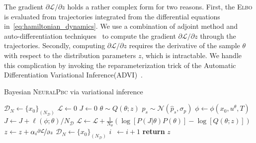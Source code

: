 \begin{enumerate}
    The gradient ${\partial \mathcal{L}}/{\partial z}$ holds a rather complex form for two reasons.
    First, the \textsc{Elbo} is evaluated from trajectories integrated from the differential equations in~\eqref{eq:hamiltonian_dynamics}.
    We use a combination of adjoint method and auto-differentiation techniques~\cite{chen2018neural} to compute the
    gradient ${\partial \mathcal{L}}/{\partial z}$ through the trajectories.
    Secondly, computing ${\partial \mathcal{L}}/{\partial z}$ requires the derivative
    of the sample $\theta$ with respect to the distribution parameters $z$, which is
    intractable. We handle this complication by invoking the reparameterization
    trick of the Automatic Differentiation Variational
    Inference(\textsc{ADVI})~\cite{kucukelbir2015automatic}.

    \begin{algorithm}
        \caption{Bayesian \textsc{NeuralPbc} via variational inference}
        \label{algo:vi}
        \small
        \begin{algorithmic}[1]
            \algrenewcommand\algorithmicindent{0em} %
            \State $\mathcal{D}_N \gets \{x_0\}_{(N_{\mathcal{D}})}$   
            \algrenewcommand\algorithmicindent{1.1em} %
            \State $\mathcal{L} \gets 0$ 
             
            \State $J \gets 0$ 
            \State $\theta \sim Q(\theta; z)$ 
                \State $p_s \sim \mathcal{N}(\hat{p}_s, \sigma_p)$
                \State $\phi \leftarrow \phi(x_0, u^\theta, T) $
                \State $J \gets J + \ell(\phi; \theta)/N_{\mathcal{D}}$ 
                \EndFor
            \State $\mathcal{L} \gets \mathcal{L} + \frac{1}{N_{\theta}} \left(\log[P(J | \theta) P(\theta)] - \log[Q(\theta;z)]\right)$
            \EndFor
            \State $z \gets z + \alpha_i \nicefrac{\partial \mathcal{L}}{\partial z}$
            \State $\mathcal{D}_N \gets \{x_0\}_{(N_{\mathcal{D}})}$
            \State $i \;\:\gets i + 1$
            \EndWhile
            \State \textbf{return} $z$
        \end{algorithmic}
    \end{algorithm}
  
    \end{enumerate}

